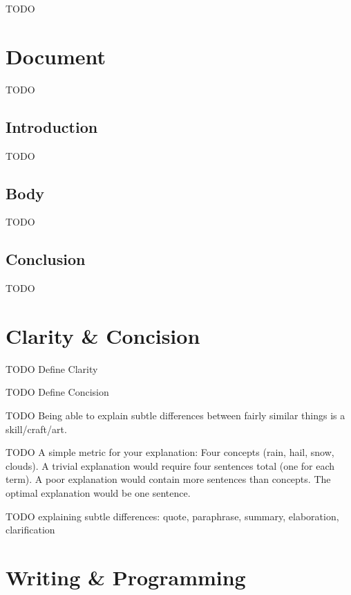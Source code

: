 \documentclass[10pt,a4paper]{book}
\begin{document}
\color{BrickRed}TODO\color{black}


\chapter{Document}

\color{BrickRed}TODO\color{black}


\section{Introduction}

\color{BrickRed}TODO\color{black}


\section{Body}

\color{BrickRed}TODO\color{black}


\section{Conclusion}

\color{BrickRed}TODO\color{black}



\chapter{Clarity \& Concision}

\color{BrickRed}TODO\color{black}
Define Clarity

\color{BrickRed}TODO\color{black}
Define Concision

\color{BrickRed}TODO\color{black}
Being able to explain subtle differences between fairly similar things is a skill/craft/art.

\color{BrickRed}TODO\color{black}
A simple metric for your explanation:
Four concepts (rain, hail, snow, clouds).
A trivial explanation would require four sentences total (one for each term).
A poor explanation would contain more sentences than concepts.
The optimal explanation would be one sentence.

\color{BrickRed}TODO\color{black}
explaining subtle differences: quote, paraphrase, summary, elaboration, clarification


\chapter{Writing \& Programming}
\end{document}
